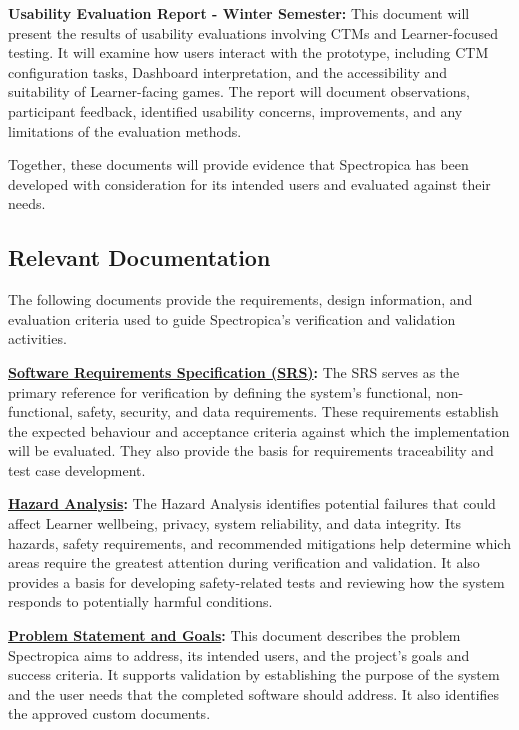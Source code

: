 \documentclass[12pt, titlepage]{article}
\newcounter{validation}
\begin{document}
\textbf{Usability Evaluation Report - Winter Semester:} This document will
present the results of usability evaluations involving CTMs and Learner-focused
testing. It will examine how users interact with the prototype, including CTM
configuration tasks, Dashboard interpretation, and the accessibility and
suitability of Learner-facing games. The report will document observations,
participant feedback, identified usability concerns, improvements, and any
limitations of the evaluation methods.

Together, these documents will provide evidence that Spectropica has been
developed with consideration for its intended users and evaluated against their
needs.

\subsection{Relevant Documentation}

The following documents provide the requirements, design information, and
evaluation criteria used to guide Spectropica's verification and validation
activities.

\textbf{\href{https://github.com/meena-alomran/game-n-grow/blob/main/pdfs/SRS-IEEE/SRS.pdf}{Software
Requirements Specification (SRS)}:} The SRS serves as the primary reference for
verification by defining the system's functional, non-functional, safety,
security, and data requirements. These requirements establish the expected
behaviour and acceptance criteria against which the implementation will be
evaluated. They also provide the basis for requirements traceability and test
case development.

\textbf{\href{https://github.com/meena-alomran/game-n-grow/blob/main/pdfs/HazardAnalysis/HazardAnalysis.pdf}{Hazard
Analysis}:} The Hazard Analysis identifies potential failures that could affect
Learner wellbeing, privacy, system reliability, and data integrity. Its hazards,
safety requirements, and recommended mitigations help determine which areas
require the greatest attention during verification and validation. It also
provides a basis for developing safety-related tests and reviewing how the
system responds to potentially harmful conditions.

\textbf{\href{https://github.com/meena-alomran/game-n-grow/blob/main/pdfs/ProblemStatementAndGoals/ProblemStatement.pdf}{Problem
Statement and Goals}:} This document describes the problem Spectropica aims to
address, its intended users, and the project's goals and success criteria. It
supports validation by establishing the purpose of the system and the user needs
that the completed software should address. It also identifies the approved
custom documents.
\end{document}
